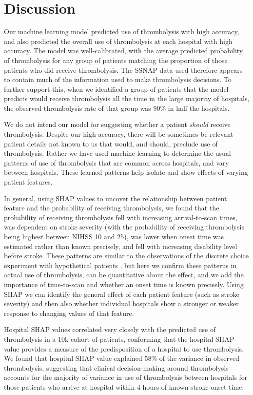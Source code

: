 \section{Discussion}

Our machine learning model predicted use of thrombolysis with high accuracy, and also predicted the overall use of thrombolysis at each hospital with high accuracy. The model was well-calibrated, with the average predicted probability of thrombolysis for any group of patients matching the proportion of those patients who did receive thrombolysis. The SSNAP data used therefore appears to contain much of the information used to make thrombolysis decisions. To further support this, when we identified a group of patients that the model predicts would receive thrombolysis all the time in the large majority of hospitals, the observed thrombolysis rate of that group was 90\% in half the hospitals.

We do not intend our model for suggesting whether a patient \emph{should} receive thrombolysis. Despite our high accuracy, there will be sometimes be relevant patient details not known to us that would, and should, preclude use of thrombolysis. Rather we have used machine learning to determine the usual patterns of use of thrombolysis that are common across hospitals, and vary between hospitals. These learned patterns help isolate and show effects of varying patient features.

In general, using SHAP values to uncover the relationship between patient feature and the probability of receiving thrombolysis, we found that the probability of receiving thrombolysis fell with increasing arrival-to-scan times, was dependent on stroke severity (with the probability of receiving thrombolysis being highest between NIHSS 10 and 25), was lower when onset time was estimated rather than known precisely, and fell with increasing disability level before stroke. These patterns are similar to the observations of the discrete choice experiment with hypothetical patients \cite{de_brun_factors_2018}, but here we confirm these patterns in actual use of thrombolysis, can be quantitative about the effect, and we add the importance of time-to-scan and whether an onset time is known precisely. Using SHAP we can identify the general effect of each patient feature (such as stroke severity) and then also whether individual hospitals show a stronger or weaker response to changing values of that feature.

Hospital SHAP values correlated very closely with the predicted use of thrombolysis in a 10k cohort of patients, conforming that the hospital SHAP value provides a measure of the predisposition of a hospital to use thrombolysis. We found that hospital SHAP value explained 58\% of the variance in observed thrombolysis, suggesting that clinical decision-making around thrombolysis accounts for the majority of variance in use of thrombolysis between hospitals for those patients who arrive at hospital within 4 hours of known stroke onset time. 

